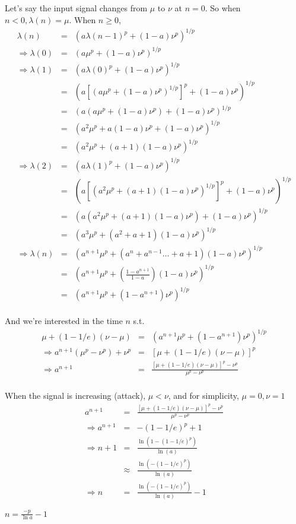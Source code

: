 \documentclass[12pt]{article}
\begin{document}
\subsection{}
Let's say the input signal changes from $\mu$ to $\nu$ at $n=0$. So when $n<0, \lambda(n) = \mu$. When $n\geq0$,
\begin{eqnarray*}
\lambda (n) &=& (a\lambda(n-1)^p + (1-a)\nu^p)^{1/p} \\
\Rightarrow \lambda (0) &=& (a\mu^p + (1-a)\nu^p)^{1/p} \\
\Rightarrow \lambda (1) &=& (a\lambda(0)^p + (1-a)\nu^p)^{1/p} \\
&=& (a[(a\mu^p + (1-a)\nu^p)^{1/p}]^p + (1-a)\nu^p)^{1/p} \\
&=& (a(a\mu^p + (1-a)\nu^p) + (1-a)\nu^p)^{1/p} \\
&=& (a^2\mu^p + a(1-a)\nu^p + (1-a)\nu^p)^{1/p} \\
&=& (a^2\mu^p + (a+1)(1-a)\nu^p)^{1/p} \\
\Rightarrow \lambda (2) &=& (a\lambda(1)^p + (1-a)\nu^p)^{1/p} \\
&=& (a[(a^2\mu^p + (a+1)(1-a)\nu^p)^{1/p} ]^p + (1-a)\nu^p)^{1/p} \\
&=& (a(a^2\mu^p + (a+1)(1-a)\nu^p) + (1-a)\nu^p)^{1/p} \\
&=& (a^3\mu^p + (a^2+a+1)(1-a)\nu^p)^{1/p} \\
\Rightarrow \lambda (n) &=& (a^{n+1}\mu^p + (a^n+a^{n-1}\ldots+a+1)(1-a)\nu^p)^{1/p} \\
&=& (a^{n+1}\mu^p + (\frac{1-a^{n+1}}{1-a})(1-a)\nu^p)^{1/p} \\
&=& (a^{n+1}\mu^p + (1-a^{n+1})\nu^p)^{1/p} \\
\end{eqnarray*}

And we're interested in the time $n$ s.t.
\begin{eqnarray*}
\mu + (1-1/e)(\nu-\mu)&=& (a^{n+1}\mu^p + (1-a^{n+1})\nu^p)^{1/p} \\
\Rightarrow a^{n+1}(\mu^p-\nu^p)+\nu^p &=&[\mu+(1-1/e)(\nu-\mu)]^p \\
\Rightarrow a^{n+1} &=& \frac{[\mu+(1-1/e)(\nu-\mu)]^p - \nu^p}{\mu^p-\nu^p}\\
\end{eqnarray*}

When the signal is increasing (attack), $\mu < \nu$, and for simplicity, $\mu=0, \nu=1$
\begin{eqnarray*}
a^{n+1} &=& \frac{[\mu+(1-1/e)(\nu-\mu)]^p - \nu^p}{\mu^p-\nu^p} \\
\Rightarrow a^{n+1} &=&-(1-1/e)^p + 1\\
\Rightarrow n+1 &=& \frac{\ln(1-(1-1/e)^p)}{\ln(a)}\\
& \approx & \frac{\ln(-(1-1/e)^p)}{\ln(a)} \\
\Rightarrow n &=&  \frac{\ln(-(1-1/e)^p)}{\ln(a)} -1
\end{eqnarray*}

$n=\frac{-p}{\ln a}-1$
\end{document}
